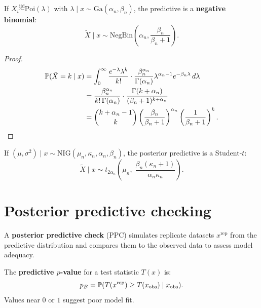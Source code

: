 \begin{theorem}
If $X_i \overset{\text{iid}}{\sim} \text{Poi}(\lambda)$ with
$\lambda \mid x \sim \text{Ga}(\alpha_n, \beta_n)$, the predictive is
a \textbf{negative binomial}:
\[
  \tilde{X} \mid x \sim \text{NegBin}\!\left(\alpha_n, \frac{\beta_n}{\beta_n + 1}\right).
\]
\end{theorem}

\begin{proof}
\begin{align*}
  \mathbb{P}(\tilde{X} = k \mid x)
  &= \int_0^\infty \frac{e^{-\lambda}\lambda^k}{k!}
  \cdot \frac{\beta_n^{\alpha_n}}{\Gamma(\alpha_n)}
  \lambda^{\alpha_n - 1} e^{-\beta_n \lambda}\,d\lambda \\
  &= \frac{\beta_n^{\alpha_n}}{k!\,\Gamma(\alpha_n)}
  \cdot \frac{\Gamma(k + \alpha_n)}{(\beta_n + 1)^{k + \alpha_n}} \\
  &= \binom{k + \alpha_n - 1}{k}
  \left(\frac{\beta_n}{\beta_n + 1}\right)^{\alpha_n}
  \left(\frac{1}{\beta_n + 1}\right)^k.
\end{align*}
\end{proof}

\begin{theorem}
If $(\mu, \sigma^2) \mid x \sim \text{NIG}(\mu_n, \kappa_n, \alpha_n, \beta_n)$,
the posterior predictive is a Student-$t$:
\[
  \tilde{X} \mid x \sim t_{2\alpha_n}\!\left(\mu_n,\;
  \frac{\beta_n(\kappa_n + 1)}{\alpha_n \kappa_n}\right).
\]
\end{theorem}

\section{Posterior predictive checking}

\begin{definition}
A \textbf{posterior predictive check} (PPC) simulates replicate datasets
$x^{\text{rep}}$ from the predictive distribution and compares them to
the observed data to assess model adequacy.
\end{definition}

\begin{definition}
The \textbf{predictive $p$-value} for a test statistic $T(x)$ is:
\[
  p_B = \mathbb{P}(T(x^{\text{rep}}) \geq T(x_{\text{obs}}) \mid x_{\text{obs}}).
\]
Values near $0$ or $1$ suggest poor model fit.
\end{definition}

